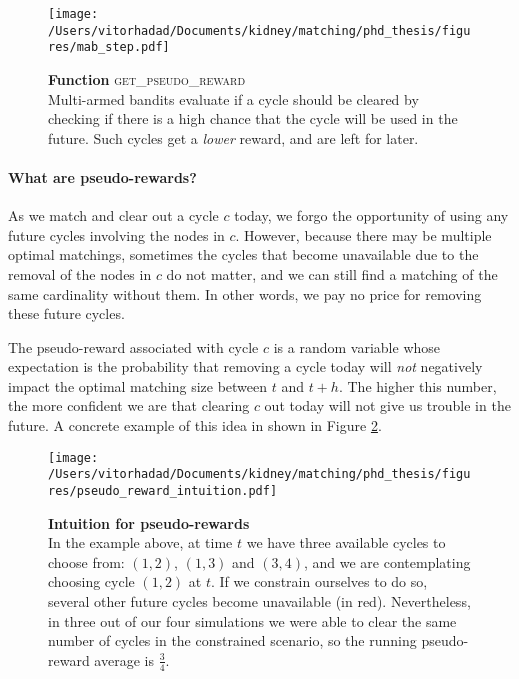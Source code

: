 \documentclass[format=acmsmall, review=false]{acmart}
\begin{document}
  \begin{figure}[htbp]
  \centering
  \texttt{[image: /Users/vitorhadad/Documents/kidney/matching/phd\_thesis/figures/mab\_step.pdf]}
  \caption{\textbf{Function} \textsc{get\_pseudo\_reward} \\ Multi-armed bandits evaluate if a cycle should be cleared by checking if there is a high chance that the cycle will be used in the future. Such cycles get a \emph{lower} reward, and are left for later.}
  \label{fig:get_pseudo_reward}
  \end{figure}

\paragraph{What are pseudo-rewards?} As we match and clear out a cycle $c$ today, we forgo the opportunity of using any future cycles involving the nodes in $c$. However, because there may be multiple optimal matchings, sometimes the cycles that become unavailable due to the removal of the nodes in $c$ do not matter, and we can still find a matching of the same cardinality without them. In other words, we pay no price for removing these future cycles.
 
The pseudo-reward associated with cycle $c$ is a random variable whose expectation is the probability that removing a cycle today will \emph{not} negatively impact the optimal matching size between $t$ and $t+h$. The higher this number, the more confident we are that clearing $c$ out today will not give us trouble in the future. A concrete example of this idea in shown in Figure \ref{fig:pseudo_reward_intuition}.

\begin{figure}[htbp]
\centering
\texttt{[image: /Users/vitorhadad/Documents/kidney/matching/phd\_thesis/figures/pseudo\_reward\_intuition.pdf]}
\caption{\textbf{Intuition for pseudo-rewards} \\
  In the example above, at time $t$ we have three available cycles to choose from: $(1,2)$, $(1,3)$ and $(3,4)$, and we are contemplating choosing cycle $(1,2)$ at $t$. If we  constrain ourselves to do so, several other future cycles become unavailable (in red). Nevertheless, in three out of our four simulations we were able to clear the same number of cycles in the constrained scenario, so the running pseudo-reward average is $\frac{3}{4}$. 
}
\label{fig:pseudo_reward_intuition}
\end{figure}
\end{document}
